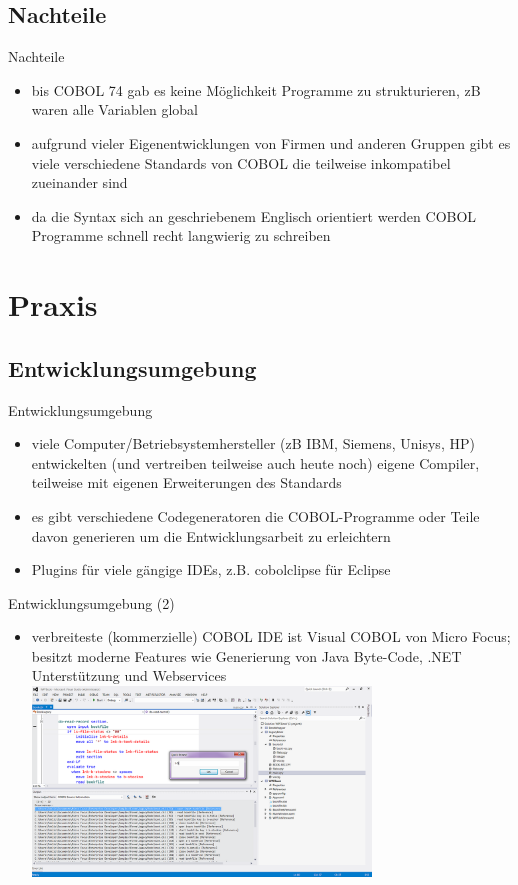 \documentclass[handout]{beamer}
\begin{document}
\subsection{Nachteile}

\begin{frame}{Nachteile}
	\begin{itemize}
		\item
		    bis COBOL 74 gab es keine M\"oglichkeit Programme zu strukturieren, zB waren alle Variablen global
		\item
			aufgrund vieler Eigenentwicklungen von Firmen und anderen Gruppen gibt es viele verschiedene Standards von COBOL die teilweise inkompatibel zueinander sind
		\item
			da die Syntax sich an geschriebenem Englisch orientiert werden COBOL Programme schnell recht langwierig zu schreiben
	\end{itemize}
\end{frame}

\section{Praxis}

\subsection{Entwicklungsumgebung}

\begin{frame}{Entwicklungsumgebung}
	\begin{itemize}
		\item
			viele Computer/Betriebsystemhersteller (zB IBM, Siemens, Unisys, HP) entwickelten (und vertreiben teilweise auch heute noch) eigene Compiler, teilweise mit eigenen Erweiterungen des Standards
		\item
			es gibt verschiedene Codegeneratoren die COBOL-Programme oder Teile davon generieren um die Entwicklungsarbeit zu erleichtern
		\item
			Plugins für viele gängige IDEs, z.B. cobolclipse für Eclipse
	\end{itemize}
\end{frame}

\begin{frame}{Entwicklungsumgebung (2)}
	\begin{itemize}			
		\item
			verbreiteste (kommerzielle) COBOL IDE ist Visual COBOL von Micro Focus; besitzt moderne Features wie Generierung von Java Byte-Code, .NET Unterstützung und Webservices
		\includegraphics[width=9cm]{VisualCOBOL2}
	\end{itemize}
\end{frame}
\end{document}

